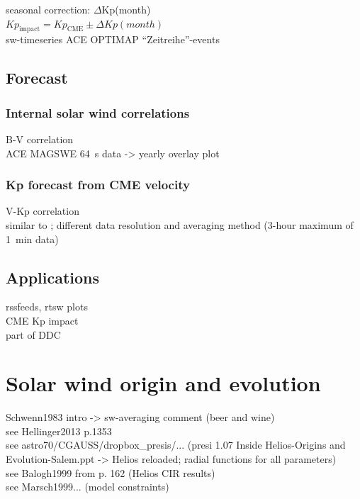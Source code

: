 seasonal correction: $\Delta$Kp(month)\\
$Kp_\text{impact} = Kp_\text{CME} \pm \Delta Kp(month)$\\

sw-timeseries ACE OPTIMAP ``Zeitreihe''-events

\section{Forecast}

\subsection{Internal solar wind correlations}
B-V correlation\\
ACE MAGSWE 64~s data -> yearly overlay plot\\

\subsection{Kp forecast from CME velocity}
V-Kp correlation\\
similar to \citet{Elliott2013}; different data resolution and averaging method (3-hour maximum of 1~min data)

\section{Applications}
rssfeeds, rtsw plots\\
CME Kp impact\\
part of DDC\\



\chapter{Solar wind origin and evolution}
Schwenn1983 intro -> sw-averaging comment (beer and wine)\\
see Hellinger2013 p.1353\\
see astro70/CGAUSS/dropbox\_presis/... (presi 1.07 Inside Helios-Origins and Evolution-Salem.ppt -> Helios reloaded; radial functions for all parameters)\\
see Balogh1999 from p. 162 (Helios CIR results)\\
see Marsch1999... (model constraints)\\


